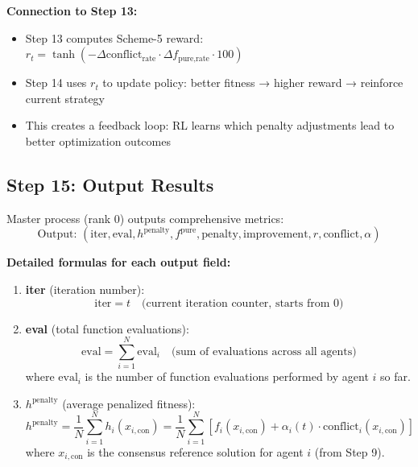\documentclass[11pt,a4paper]{article}
\begin{document}
\begin{itemize}
\textbf{Connection to Step 13:}
\begin{itemize}
    \item Step 13 computes Scheme-5 reward: $r_t=\tanh\!\left(-\Delta\text{conflict}_{\text{rate}}\cdot\Delta f_{\text{pure,rate}}\cdot100\right)$
    \item Step 14 uses $r_t$ to update policy: better fitness → higher reward → reinforce current strategy
    \item This creates a feedback loop: RL learns which penalty adjustments lead to better optimization outcomes
\end{itemize}

\subsection{Step 15: Output Results}
Master process (rank 0) outputs comprehensive metrics:
\begin{equation}
\text{Output: } (\text{iter}, \text{eval}, h^{\text{penalty}}, f^{\text{pure}}, \text{penalty}, \text{improvement}, r, \text{conflict}, \alpha)
\end{equation}

\textbf{Detailed formulas for each output field:}

\begin{enumerate}
    \item \textbf{iter} (iteration number):
    \begin{equation}
    \text{iter} = t \quad \text{(current iteration counter, starts from 0)}
    \end{equation}
    
    \item \textbf{eval} (total function evaluations):
    \begin{equation}
    \text{eval} = \sum_{i=1}^N \text{eval}_i \quad \text{(sum of evaluations across all agents)}
    \end{equation}
    where $\text{eval}_i$ is the number of function evaluations performed by agent $i$ so far.
    
    \item \textbf{$h^{\text{penalty}}$} (average penalized fitness):
    \begin{equation}
    h^{\text{penalty}} = \frac{1}{N}\sum_{i=1}^N h_i(x_{i,\text{con}}) = \frac{1}{N}\sum_{i=1}^N \left[f_i(x_{i,\text{con}}) + \alpha_i(t) \cdot \text{conflict}_i(x_{i,\text{con}})\right]
    \end{equation}
    where $x_{i,\text{con}}$ is the consensus reference solution for agent $i$ (from Step 9).
    

\end{enumerate}
\end{itemize}
\end{document}
